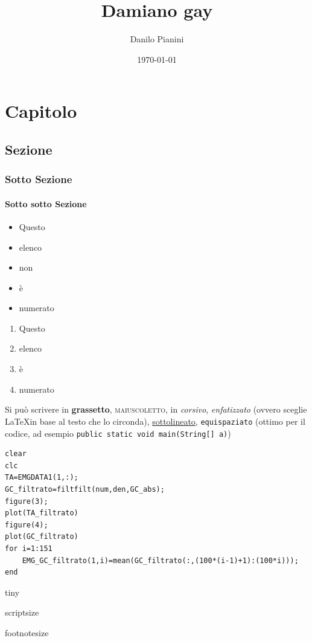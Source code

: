 \documentclass[a4paper,12pt]{report}
\title{Damiano gay}
\author{Danilo Pianini}
\date{\today}
\begin{document}
 
\maketitle

\tableofcontents
 
\chapter{Capitolo}
\section{Sezione}
\subsection{Sotto Sezione}
\subsubsection{Sotto sotto Sezione}
\begin{itemize}
 \item Questo
 \item elenco
 \item non
 \item è
 \item numerato
\end{itemize}
\begin{enumerate}
 \item Questo
 \item elenco
 \item è
 \item numerato
\end{enumerate}

Si può scrivere in \textbf{grassetto}, \textsc{maiuscoletto}, in \textit{corsivo}, \emph{enfatizzato} (ovvero sceglie \LaTeX in base al testo che lo circonda), \underline{sottolineato}, \texttt{equispaziato} (ottimo per il codice, ad esempio \texttt{public static void main(String[] a)})

\begin{verbatim}
clear
clc
TA=EMGDATA1(1,:);
GC_filtrato=filtfilt(num,den,GC_abs);
figure(3);
plot(TA_filtrato)
figure(4);
plot(GC_filtrato)
for i=1:151
    EMG_GC_filtrato(1,i)=mean(GC_filtrato(:,(100*(i-1)+1):(100*i)));
end
\end{verbatim}

\tiny
tiny

\scriptsize
scriptsize

\footnotesize
footnotesize
\end{document}
